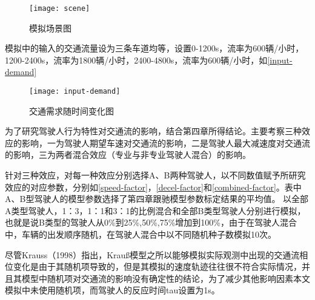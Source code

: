 \begin{figure}[!htb]
\begin{center}
\texttt{[image: scene]}
\end{center}
\caption{模拟场景图}
\label{scene}
\end{figure}

模拟中的输入的交通流量设为三条车道均等，设置0-1200s，流率为600辆/小时，1200-2400s，流率为1800辆/小时，2400-4800s，流率为600辆/小时，如\autoref{input-demand}

\begin{figure}[!htb]
\begin{center}
\texttt{[image: input-demand]}
\end{center}
\caption{交通需求随时间变化图}
\label{input-demand}
\end{figure}

为了研究驾驶人行为特性对交通流的影响，结合第四章所得结论。主要考察三种效应的影响，一为驾驶人期望车速对交通流的影响，二是驾驶人最大减速度对交通流的影响，三为两者混合效应（专业与非专业驾驶人混合）的影响。



针对三种效应，对每一种效应分别选择A、B两种驾驶人，以不同数值赋予所研究效应的对应参数，分别如\autoref{speed-factor}，\autoref{decel-factor}和\autoref{combined-factor}。表中A、B型驾驶人的模型参数选择了第四章跟驰模型参数标定结果的平均值。
以全部A类型驾驶人，1：3，1：1和3：1的比例混合和全部B类型驾驶人分别进行模拟，也就是说B类型的驾驶人从0\%到25\%,50\%,75\%增加到100\%，由于在驾驶人混合中，车辆的出发顺序随机，在驾驶人混合中以不同随机种子数模拟10次。

尽管Krauss（1998）\cite{Krauss1998}指出，Krauß模型之所以能够模拟实际观测中出现的交通流相位变化是由于其随机项导致的，但是其模拟的速度轨迹往往很不符合实际情况，并且其模型中随机项对交通流的影响没有确定性的结论，为了减少其他影响因素本文模拟中未使用随机项，而驾驶人的反应时间tau设置为1s。

